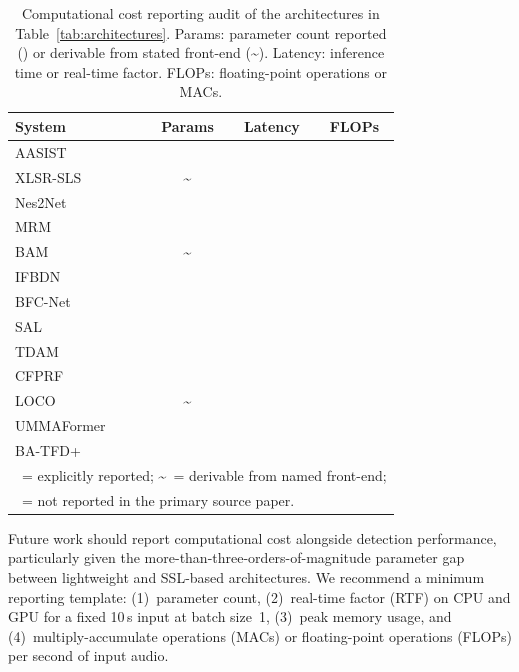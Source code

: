 \documentclass[journal]{IEEEtran}
\newcommand{\cmark}{\ding{51}}
\newcommand{\xmark}{\ding{55}}
\begin{document}
\begin{table}[t]
\centering
\caption{Computational cost reporting audit of the architectures in Table~\ref{tab:architectures}. Params: parameter count reported (\cmark) or derivable from stated front-end (\textasciitilde). Latency: inference time or real-time factor. FLOPs: floating-point operations or MACs.}
\label{tab:cost_audit}
\small
\begin{tabular}{lccc}
\toprule
\textbf{System} & \textbf{Params} & \textbf{Latency} & \textbf{FLOPs} \\
\midrule
AASIST~\cite{jung2022aasist}             & \cmark  & \xmark & \xmark \\
XLSR-SLS~\cite{zhang2024xlrsls}          & \textasciitilde & \xmark & \xmark \\
Nes2Net~\cite{liu2025nes2net}            & \xmark  & \xmark & \xmark \\
MRM~\cite{zhang2023partialspoof}         & \xmark  & \xmark & \xmark \\
BAM~\cite{zhong2024bam}                  & \textasciitilde & \xmark & \xmark \\
IFBDN~\cite{cai2024ifbdn}               & \xmark  & \xmark & \xmark \\
BFC-Net~\cite{zhou2025bfcnet}            & \xmark  & \xmark & \xmark \\
SAL~\cite{sal2026}                       & \xmark  & \xmark & \xmark \\
TDAM~\cite{li2025tdam}                   & \xmark  & \xmark & \xmark \\
CFPRF~\cite{wu2024cfprf}                 & \xmark  & \xmark & \xmark \\
LOCO~\cite{10.24963/ijcai.2025/65}                   & \textasciitilde & \xmark & \xmark \\
UMMAFormer~\cite{zhang2023ummaformer}    & \xmark  & \xmark & \xmark \\
BA-TFD+~\cite{cai2023lavdf_cviu}        & \xmark  & \xmark & \xmark \\
\bottomrule
\multicolumn{4}{l}{\footnotesize \cmark\ = explicitly reported; \textasciitilde\ = derivable from named front-end;} \\
\multicolumn{4}{l}{\footnotesize \xmark\ = not reported in the primary source paper.}
\end{tabular}
\end{table}

Future work should report computational cost alongside detection performance, particularly given the more-than-three-orders-of-magnitude parameter gap between lightweight and SSL-based architectures. We recommend a minimum reporting template: (1)~parameter count, (2)~real-time factor (RTF) on CPU and GPU for a fixed 10\,s input at batch size~1, (3)~peak memory usage, and (4)~multiply-accumulate operations (MACs) or floating-point operations (FLOPs) per second of input audio.
\end{document}
